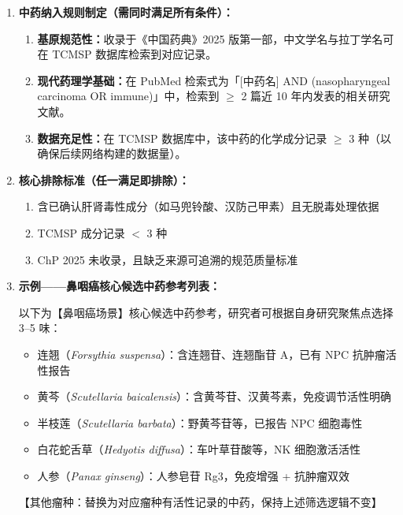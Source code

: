 \documentclass[12pt,a4paper,twoside]{article}
\begin{document}
\begin{enumerate}
  \item \textbf{中药纳入规则制定（需同时满足所有条件）：}
    \begin{enumerate}
      \item \textbf{基原规范性：}收录于《中国药典》2025 版第一部，中文学名与拉丁学名可在 TCMSP 数据库检索到对应记录。
      \item \textbf{现代药理学基础：}在 PubMed 检索式为「[中药名] AND (nasopharyngeal carcinoma OR immune)」中，检索到 $\geq$ 2 篇近 10 年内发表的相关研究文献。
      \item \textbf{数据充足性：}在 TCMSP 数据库中，该中药的化学成分记录 $\geq$ 3 种（以确保后续网络构建的数据量）。
    \end{enumerate}

  \item \textbf{核心排除标准（任一满足即排除）：}
    \begin{enumerate}
      \item 含已确认肝肾毒性成分（如马兜铃酸、汉防己甲素）且无脱毒处理依据
      \item TCMSP 成分记录 $<$ 3 种
      \item ChP 2025 未收录，且缺乏来源可追溯的规范质量标准
    \end{enumerate}

  \item \textbf{示例——鼻咽癌核心候选中药参考列表：}

    \begin{templatebox}
    以下为【鼻咽癌场景】核心候选中药参考，研究者可根据自身研究聚焦点选择 3--5 味：
    \begin{itemize}
      \item 连翘（\textit{Forsythia suspensa}）：含连翘苷、连翘酯苷 A，已有 NPC 抗肿瘤活性报告
      \item 黄芩（\textit{Scutellaria baicalensis}）：含黄芩苷、汉黄芩素，免疫调节活性明确
      \item 半枝莲（\textit{Scutellaria barbata}）：野黄芩苷等，已报告 NPC 细胞毒性
      \item 白花蛇舌草（\textit{Hedyotis diffusa}）：车叶草苷酸等，NK 细胞激活活性
      \item 人参（\textit{Panax ginseng}）：人参皂苷 Rg3，免疫增强 + 抗肿瘤双效
    \end{itemize}
    【其他瘤种：替换为对应瘤种有活性记录的中药，保持上述筛选逻辑不变】
    \end{templatebox}
\end{enumerate}
\end{document}
